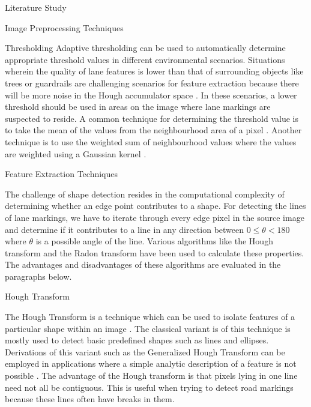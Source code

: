 \documentclass{matthijs}
\begin{document}
\begin{hoofdstuk}{Literature Study}
\begin{paragraaf}{Image Preprocessing Techniques}
\begin{subparagraaf}{Thresholding}
				Adaptive thresholding can be used to automatically determine appropriate threshold values in different environmental scenarios.
				Situations wherein the quality of lane features is lower than that of surrounding objects like trees or guardrails are challenging scenarios for feature extraction because there will be more noise in the Hough accumulator space \cite{son2019robust}.
				In these scenarios, a lower threshold should be used in areas on the image where lane markings are suspected to reside.
				A common technique for determining the threshold value is to take the mean of the values from the neighbourhood area of a pixel \cite{yuan2018robust}.
				Another technique is to use the weighted sum of neighbourhood values where the values are weighted using a Gaussian kernel \cite{soeleman2020adaptive}.

			\end{subparagraaf}

		\end{paragraaf}

		\begin{paragraaf}{Feature Extraction Techniques}

			The challenge of shape detection resides in the computational complexity of determining whether an edge point contributes to a shape.
			For detecting the lines of lane markings, we have to iterate through every edge pixel in the source image and determine if it contributes to a line in any direction between $0 \leq \theta < 180$ where $\theta$ is a possible angle of the line.
			Various algorithms like the Hough transform and the Radon transform have been used to calculate these properties.
			The advantages and disadvantages of these algorithms are evaluated in the paragraphs below.

			\begin{subparagraaf}{Hough Transform}

				The Hough Transform is a technique which can be used to isolate features of a particular shape within an image \cite{fisher2003hypermedia}.
				The classical variant is of this technique is mostly used to detect basic predefined shapes such as lines and ellipses.
				Derivations of this variant such as the Generalized Hough Transform can be employed in applications where a simple analytic description of a feature is not possible \cite{fisher2003hypermedia}.
				The advantage of the Hough transform is that pixels lying in one line need not all be contiguous.\cite{kahl2000hough}
				This is useful when trying to detect road markings because these lines often have breaks in them.


\end{subparagraaf}
\end{paragraaf}
\end{hoofdstuk}
\end{document}
